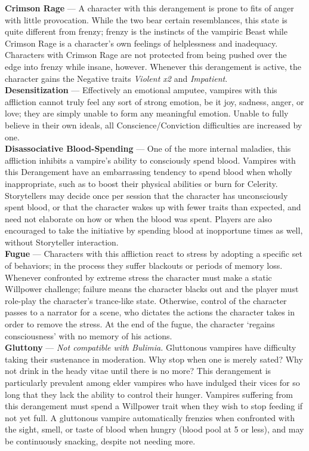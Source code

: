 \textbf{Crimson Rage} --- A character with this derangement is prone to fits of anger with little provocation.  While the two bear certain resemblances, this state is quite different from frenzy; frenzy is the instincts of the vampiric Beast while Crimson Rage is a character's own feelings of helplessness and inadequacy.  Characters with Crimson Rage are not protected from being pushed over the edge into frenzy while insane, however.  Whenever this derangement is active, the character gains the Negative traits \emph{Violent x2} and \emph{Impatient}. \\

\textbf{Desensitization} --- Effectively an emotional amputee, vampires with this affliction cannot truly feel any sort of strong emotion, be it joy, sadness, anger, or love; they are simply unable to form any meaningful emotion.  Unable to fully believe in their own ideals, all Conscience/Conviction difficulties are increased by one. \\

\textbf{Disassociative Blood-Spending} --- One of the more internal maladies, this affliction inhibits a vampire's ability to consciously spend blood.  Vampires with this Derangement have an embarrassing tendency to spend blood when wholly inappropriate, such as to boost their physical abilities or burn for Celerity.  Storytellers may decide once per session that the character has unconsciously spent blood, or that the character wakes up with fewer traits than expected, and need not elaborate on how or when the blood was spent.  Players are also encouraged to take the initiative by spending blood at inopportune times as well, without Storyteller interaction. \\

\textbf{Fugue} --- Characters with this affliction react to stress by adopting a specific set of behaviors; in the process they suffer blackouts or periods of memory loss.  Whenever confronted by extreme stress the character must make a static Willpower challenge; failure means the character blacks out and the player must role-play the character's trance-like state.  Otherwise, control of the character passes to a narrator for a scene, who dictates the actions the character takes in order to remove the stress.  At the end of the fugue, the character `regains consciousness' with no memory of his actions. \\

\textbf{Gluttony} --- \emph{Not compatible with Bulimia.}  Gluttonous vampires have difficulty taking their sustenance in moderation.  Why stop when one is merely sated?  Why not drink in the heady vitae until there is no more?  This derangement is particularly prevalent among elder vampires who have indulged their vices for so long that they lack the ability to control their hunger.  Vampires suffering from this derangement must spend a Willpower trait when they wish to stop feeding if not yet full.  A gluttonous vampire automatically frenzies when confronted with the sight, smell, or taste of blood when hungry (blood pool at 5 or less), and may be continuously snacking, despite not needing more. \\

